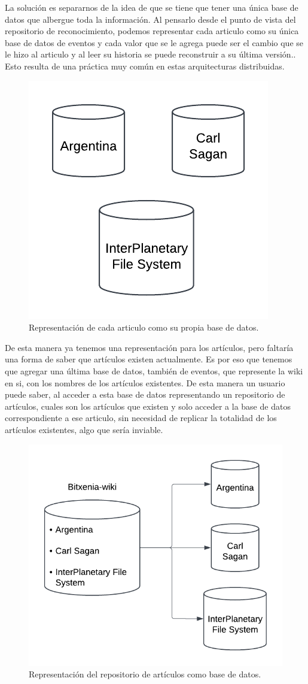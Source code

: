 La solución es separarnos de la idea de que se tiene que tener una única base de datos que albergue toda la información. Al pensarlo desde el punto de vista del repositorio de reconocimiento, podemos representar cada articulo como su única base de datos de eventos y cada valor que se le agrega puede ser el cambio que se le hizo al articulo y al leer su historia se puede reconstruir a su última versión.. Esto resulta de una práctica muy común en estas arquitecturas distribuidas.

\begin{figure}[H]
    \centering
    \includegraphics[width=0.5\linewidth]{img/solucion-ipfs/bdd-articulos.png}
    \caption{Representación de cada articulo como su propia base de datos.}
    \label{fig:bdd-articulos}
\end{figure}

De esta manera ya tenemos una representación para los artículos, pero faltaría una forma de saber que artículos existen actualmente. Es por eso que tenemos que agregar una última base de datos, también de eventos, que represente la wiki en si, con los nombres de los artículos existentes. De esta manera un usuario puede saber, al acceder a esta base de datos representando un repositorio de artículos, cuales son los artículos que existen y solo acceder a la base de datos correspondiente a ese articulo, sin necesidad de replicar la totalidad de los artículos existentes, algo que sería inviable.

\begin{figure}[H]
    \centering
    \includegraphics[width=0.5\linewidth]{img/solucion-ipfs/bdd-wiki.png}
    \caption{Representación del repositorio de artículos como base de datos.}
    \label{fig:bdd-wiki}
\end{figure}

